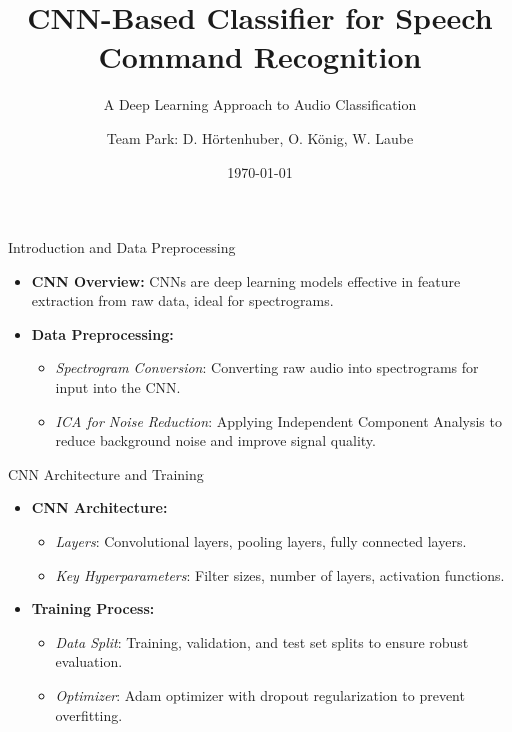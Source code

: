 \documentclass{beamer}
\title{CNN-Based Classifier for Speech Command Recognition}
\subtitle{A Deep Learning Approach to Audio Classification}
\author{Team Park: D. Hörtenhuber, O. König, W. Laube}
\institute{JKU \\ MLPC}
\date{\today}
\begin{document}
\begin{frame}
  \titlepage
\end{frame}

\begin{frame}{Introduction and Data Preprocessing}
  \begin{itemize}
    \item \textbf{CNN Overview:} CNNs are deep learning models effective in feature extraction from raw data, ideal for spectrograms.
    \item \textbf{Data Preprocessing:}
      \begin{itemize}
        \item \textit{Spectrogram Conversion}: Converting raw audio into spectrograms for input into the CNN.
        \item \textit{ICA for Noise Reduction}: Applying Independent Component Analysis to reduce background noise and improve signal quality.
      \end{itemize}
  \end{itemize}
\end{frame}

\begin{frame}{CNN Architecture and Training}
  \begin{itemize}
    \item \textbf{CNN Architecture:}
      \begin{itemize}
        \item \textit{Layers}: Convolutional layers, pooling layers, fully connected layers.
        \item \textit{Key Hyperparameters}: Filter sizes, number of layers, activation functions.
      \end{itemize}
    \item \textbf{Training Process:}
      \begin{itemize}
        \item \textit{Data Split}: Training, validation, and test set splits to ensure robust evaluation.
        \item \textit{Optimizer}: Adam optimizer with dropout regularization to prevent overfitting.
      \end{itemize}
  \end{itemize}
\end{frame}
\end{document}
